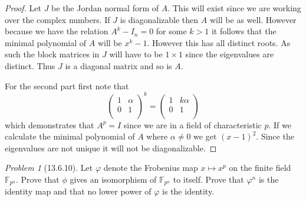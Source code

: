 \documentclass[10pt]{article}
\newcommand{\sk}{\vskip 10mm}
\newcommand{\bb}[1]{\mathbb{#1}}
\theoremstyle{remark}
\newtheorem{problem}{Problem}
\theoremstyle{remark}
\begin{document}
\begin{proof}
  Let $J$ be the Jordan normal form of $A$. This will exist since
  we are working over the complex numbers. If $J$ is diagonalizable
  then $A$ will be as well. However because we have the relation
  $A^k-I_n=0$ for some $k>1$ it follows that the minimal polynomial
  of $A$ will be $x^k-1$. However this has all distinct roots. As such
  the block matrices in $J$ will have to be $1\times 1$ since the eigenvalues
  are distinct. Thus $J$ is a diagonal matrix and so is $A$.

  \sk
  
  For the second part first note that
  \[
    \left(
      \begin{array}{cc}
        1&\alpha\\
        0&1\\
      \end{array}
    \right)^k
    =
    \left(
      \begin{array}{cc}
        1&k\alpha\\
        0&1\\
      \end{array}
    \right)
  \]
  which demonstrates that $A^p=I$ since we are in a field of characteristic
  $p$. If we calculate the minimal polynomial of $A$ where $\alpha\neq 0$
  we get $(x-1)^2$. Since the eigenvalues are not unique it will not be
  diagonalizable.
\end{proof}

\sk

\begin{problem}[13.6.10]
  Let $\varphi$ denote the Frobenius map $x\mapsto x^p$ on the finite field
  $\bb{F}_{p^n}$. Prove that $\phi$ gives an isomorphism of $\bb{F}_{p^n}$
  to itself. Prove that $\varphi^n$ is the identity map and that no
  lower power of $\varphi$ is the identity.
\end{problem}
\end{document}
